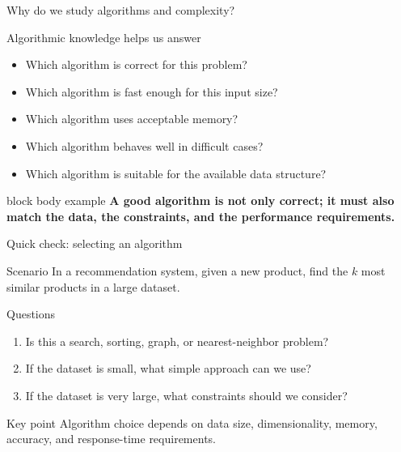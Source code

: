 \documentclass[aspectratio=169]{beamer}
\begin{document}
\begin{frame}{Why do we study algorithms and complexity?}
  \small

  \begin{block}{Algorithmic knowledge helps us answer}
    \begin{itemize}
      \item Which algorithm is correct for this problem?
      \item Which algorithm is fast enough for this input size?
      \item Which algorithm uses acceptable memory?
      \item Which algorithm behaves well in difficult cases?
      \item Which algorithm is suitable for the available data structure?
    \end{itemize}
  \end{block}

  \vspace{0.35cm}

  \begin{beamercolorbox}[
      wd=\textwidth,
      sep=0.75em,
      center,
      rounded=true
    ]{block body example}
    \textbf{A good algorithm is not only correct; it must also match the data, the constraints, and the performance requirements.}
  \end{beamercolorbox}
\end{frame}

\begin{frame}{Quick check: selecting an algorithm}
  \small

  \begin{block}{Scenario}
    In a recommendation system, given a new product, find the $k$ most similar products in a large dataset.
  \end{block}

  \begin{alertblock}{Questions}
    \begin{enumerate}
      \item Is this a search, sorting, graph, or nearest-neighbor problem?
      \item If the dataset is small, what simple approach can we use?
      \item If the dataset is very large, what constraints should we consider?
    \end{enumerate}
  \end{alertblock}

  \begin{exampleblock}{Key point}
    Algorithm choice depends on data size, dimensionality, memory, accuracy, and response-time requirements.
  \end{exampleblock}
\end{frame}
\end{document}
